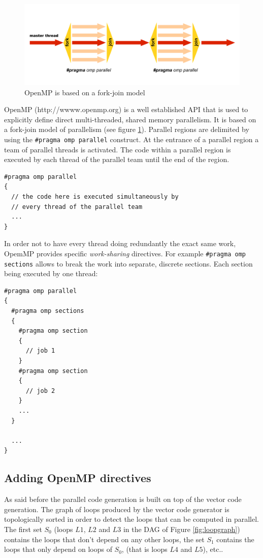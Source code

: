 \documentclass[a4paper]{book}
\begin{document}
\begin{figure}[htb]
  \centering
  \includegraphics[scale=0.5,angle=-90]{images/openmp-model}
  \caption{OpenMP is based on a fork-join model}   
  \label{fig:openmp}
\end{figure}

OpenMP (http://wwww.openmp.org) is a well established API that is used to explicitly define direct multi-threaded, shared memory parallelism. It is based on a fork-join model of parallelism (see figure \ref{fig:openmp}). 
Parallel regions are delimited by using the \lstinline!#pragma omp parallel! construct. At the entrance of a parallel region a team of parallel threads is activated. The code within a parallel region is executed by each thread of the parallel team until the end of the region. 

\begin{lstlisting}
#pragma omp parallel
{
  // the code here is executed simultaneously by 
  // every thread of the parallel team
  ...
}
\end{lstlisting}

In order not to have every thread doing redundantly the exact same work, OpemMP provides specific \textit{work-sharing} directives. For example \lstinline!#pragma omp sections! allows to break the work into separate, discrete sections. Each section being executed by one thread:

\begin{lstlisting}
#pragma omp parallel
{
  #pragma omp sections
  {
    #pragma omp section
    {
      // job 1
    }
    #pragma omp section
    {
      // job 2
    }
    ...
  }

  ...
}
\end{lstlisting}

\subsection{Adding OpenMP directives}
As said before the parallel code generation is built on top of the vector code generation. The graph of loops produced by the vector code generator is topologically sorted in order to detect the loops that can be computed in parallel. The first set $S_0$ (loops $L1$, $L2$ and $L3$ in the DAG of Figure \ref{fig:loopgraph}) contains the loops that don't depend on any other loops, the set $S_1$ contains the loops that only depend on loops of $S_0$, (that is loops $L4$ and $L5$), etc.. 
\end{document}
